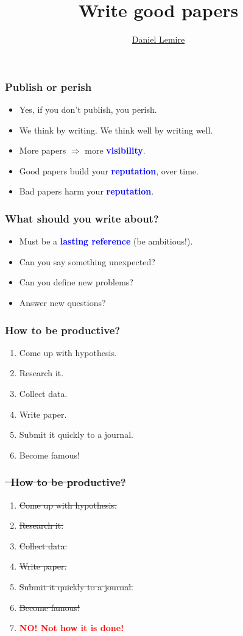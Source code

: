 \documentclass[handout]{beamer}
\title{Write good papers}
\date{}
\author{\href{http://lemire.me/en/}{Daniel Lemire}}
\institute{
	\url{http://lemire.me/en/}\\
	blog: \url{http://lemire.me/blog/}\\
	~\\
}
\date{}
\newcommand{\vimportant}[1]{\textcolor{red}{\textbf{#1}}}
\newcommand{\important}[1]{\textcolor{blue}{\textbf{#1}}}
\begin{document}
\frame{\titlepage}



\frame
{
  \frametitle{Publish or perish}
 \begin{itemize}
  \item<1-> Yes, if you don't publish, you perish.
\item<2-> We think by writing. We think well by writing well.
   \item<3-> More papers $\Rightarrow$ more \important{visibility}.
   \item<4-> Good papers build your \important{reputation}, over time.
   \item<5-> Bad papers harm your \important{reputation}.
 \end{itemize}
}




\frame
{
  \frametitle{What should you write about?}
 \begin{itemize}
  \item<1-> Must be a \important{lasting reference} (be ambitious!).
  \item<2-> Can you say something unexpected?
    \item<3-> Can you define new problems?
    \item<4-> Answer new questions?
  \end{itemize}
}


\frame
{
  \frametitle{How to be productive?}
 \begin{enumerate}
 \item Come up with hypothesis.
  \item Research it.
  \item Collect data.
  \item Write paper.
  \item Submit it quickly to a journal.
  \item Become famous!
 \end{enumerate}
}


\frame
{
  \frametitle{\sout{ How to be productive?} }
 \begin{enumerate}
 \item \sout {Come up with hypothesis.}
  \item \sout{ Research it.}
  \item \sout {Collect data.}
  \item \sout {Write paper.}
  \item \sout {Submit it quickly to a journal.}
  \item \sout {Become famous!}
  \item {\Large \vimportant{NO! Not how it is done!}}
 \end{enumerate}
}
\end{document}
